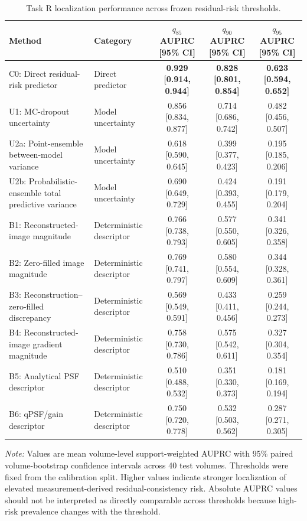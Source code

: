 \begin{table}[t]
\centering
\caption{Task R localization performance across frozen residual-risk thresholds.}
\label{tab:task_r_threshold_sensitivity}
\begin{tabular}{llccc}
\hline
Method & Category & $q_{85}$ AUPRC [95\% CI] & $q_{90}$ AUPRC [95\% CI] & $q_{95}$ AUPRC [95\% CI] \\
\hline
C0: Direct residual-risk predictor & Direct predictor & \textbf{0.929 [0.914, 0.944]} & \textbf{0.828 [0.801, 0.854]} & \textbf{0.623 [0.594, 0.652]} \\
U1: MC-dropout uncertainty & Model uncertainty & 0.856 [0.834, 0.877] & 0.714 [0.686, 0.742] & 0.482 [0.456, 0.507] \\
U2a: Point-ensemble between-model variance & Model uncertainty & 0.618 [0.590, 0.645] & 0.399 [0.377, 0.423] & 0.195 [0.185, 0.206] \\
U2b: Probabilistic-ensemble total predictive variance & Model uncertainty & 0.690 [0.649, 0.729] & 0.424 [0.393, 0.455] & 0.191 [0.179, 0.204] \\
B1: Reconstructed-image magnitude & Deterministic descriptor & 0.766 [0.738, 0.793] & 0.577 [0.550, 0.605] & 0.341 [0.326, 0.358] \\
B2: Zero-filled image magnitude & Deterministic descriptor & 0.769 [0.741, 0.797] & 0.580 [0.554, 0.609] & 0.344 [0.328, 0.361] \\
B3: Reconstruction--zero-filled discrepancy & Deterministic descriptor & 0.569 [0.549, 0.591] & 0.433 [0.411, 0.456] & 0.259 [0.244, 0.273] \\
B4: Reconstructed-image gradient magnitude & Deterministic descriptor & 0.758 [0.730, 0.786] & 0.575 [0.542, 0.611] & 0.327 [0.304, 0.354] \\
B5: Analytical PSF descriptor & Deterministic descriptor & 0.510 [0.488, 0.532] & 0.351 [0.330, 0.373] & 0.181 [0.169, 0.194] \\
B6: qPSF/gain descriptor & Deterministic descriptor & 0.750 [0.720, 0.778] & 0.532 [0.503, 0.562] & 0.287 [0.271, 0.305] \\
\hline
\end{tabular}
\begin{minipage}{0.98\textwidth}
\footnotesize
\textit{Note:} Values are mean volume-level support-weighted AUPRC with 95\% paired volume-bootstrap confidence intervals across 40 test volumes. Thresholds were fixed from the calibration split. Higher values indicate stronger localization of elevated measurement-derived residual-consistency risk. Absolute AUPRC values should not be interpreted as directly comparable across thresholds because high-risk prevalence changes with the threshold.
\end{minipage}
\end{table}
